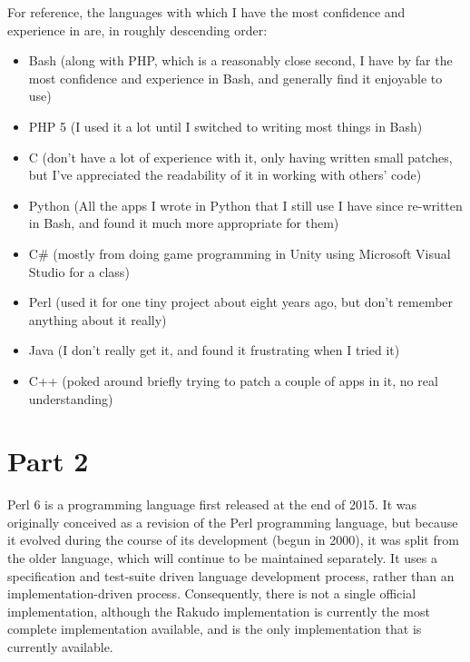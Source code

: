 \documentclass[14pt,english]{extarticle}
\begin{document}
For reference, the languages with which I have the most confidence
and experience in are, in roughly descending order:
\begin{itemize}
\item Bash (along with PHP, which is a reasonably close second, I have by
far the most confidence and experience in Bash, and generally find
it enjoyable to use)
\item PHP 5 (I used it a lot until I switched to writing most things in
Bash)
\item C (don't have a lot of experience with it, only having written small
patches, but I've appreciated the readability of it in working with
others’ code)
\item Python (All the apps I wrote in Python that I still use I have since
re-written in Bash, and found it much more appropriate for them)
\item C\# (mostly from doing game programming in Unity using Microsoft Visual
Studio for a class)
\item Perl (used it for one tiny project about eight years ago, but don't
remember anything about it really)
\item Java (I don't really get it, and found it frustrating when I tried
it)
\item C++ (poked around briefly trying to patch a couple of apps in it,
no real understanding)
\end{itemize}

\part*{Part 2}

Perl 6 is a programming language first released at the end of 2015.
It was originally conceived as a revision of the Perl programming
language, but because it evolved during the course of its development
(begun in 2000), it was split from the older language, which will
continue to be maintained separately. It uses a specification and
test-suite driven language development process, rather than an implementation-driven
process. Consequently, there is not a single official implementation,
although the Rakudo implementation is currently the most complete
implementation available, and is the only implementation that is currently
available.
\end{document}
